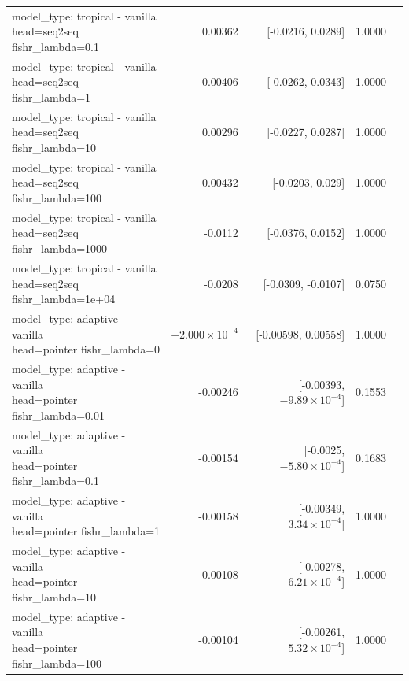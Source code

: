 \documentclass[10pt]{article}
\makeatletter
\newcommand{\stackcell}[1]{\begin{tabular}[t]{@{}l@{}}#1\end{tabular}}
\makeatother
\begin{document}
{\begin{longtable}{lrrrl}
\stackcell{model\_type: tropical - vanilla\\\footnotesize head=seq2seq fishr\_lambda=0.1 } & 0.00362 & [-0.0216, 0.0289] & 1.0000 & \\
\stackcell{model\_type: tropical - vanilla\\\footnotesize head=seq2seq fishr\_lambda=1 } & 0.00406 & [-0.0262, 0.0343] & 1.0000 & \\
\stackcell{model\_type: tropical - vanilla\\\footnotesize head=seq2seq fishr\_lambda=10 } & 0.00296 & [-0.0227, 0.0287] & 1.0000 & \\
\stackcell{model\_type: tropical - vanilla\\\footnotesize head=seq2seq fishr\_lambda=100 } & 0.00432 & [-0.0203, 0.029] & 1.0000 & \\
\stackcell{model\_type: tropical - vanilla\\\footnotesize head=seq2seq fishr\_lambda=1000 } & -0.0112 & [-0.0376, 0.0152] & 1.0000 & \\
\stackcell{model\_type: tropical - vanilla\\\footnotesize head=seq2seq fishr\_lambda=1e+04 } & -0.0208 & [-0.0309, -0.0107] & 0.0750 & \\
\stackcell{model\_type: adaptive - vanilla\\\footnotesize head=pointer fishr\_lambda=0 } & $-2.000\times10^{-4}$ & [-0.00598, 0.00558] & 1.0000 & \\
\stackcell{model\_type: adaptive - vanilla\\\footnotesize head=pointer fishr\_lambda=0.01 } & -0.00246 & [-0.00393, $-9.89\times10^{-4}$] & 0.1553 & \\
\stackcell{model\_type: adaptive - vanilla\\\footnotesize head=pointer fishr\_lambda=0.1 } & -0.00154 & [-0.0025, $-5.80\times10^{-4}$] & 0.1683 & \\
\stackcell{model\_type: adaptive - vanilla\\\footnotesize head=pointer fishr\_lambda=1 } & -0.00158 & [-0.00349, $3.34\times10^{-4}$] & 1.0000 & \\
\stackcell{model\_type: adaptive - vanilla\\\footnotesize head=pointer fishr\_lambda=10 } & -0.00108 & [-0.00278, $6.21\times10^{-4}$] & 1.0000 & \\
\stackcell{model\_type: adaptive - vanilla\\\footnotesize head=pointer fishr\_lambda=100 } & -0.00104 & [-0.00261, $5.32\times10^{-4}$] & 1.0000 & \\

\end{longtable}}
\end{document}

